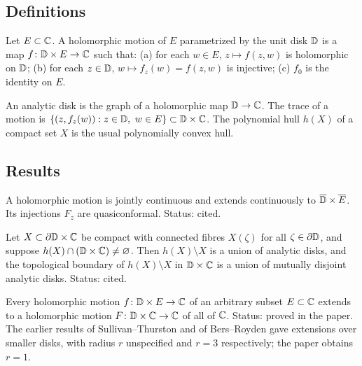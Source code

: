 \subsection*{Definitions}

\begin{definition}
\label{def:holomorphic-motion}
Let $E\subset\mathbb C$.  A holomorphic motion of $E$ parametrized by the unit disk $\mathbb D$ is a map $f\colon\mathbb D\times E\to\mathbb C$ such that:
(a) for each $w\in E$, $z\mapsto f(z,w)$ is holomorphic on $\mathbb D$; (b) for each $z\in\mathbb D$, $w\mapsto f_z(w)=f(z,w)$ is injective; (c) $f_0$ is the identity on $E$.
\end{definition}

\begin{definition}
\label{def:holomorphic-trace}
An analytic disk is the graph of a holomorphic map $\mathbb D\to\mathbb C$.  The trace of a motion is
$\{(z,f_z(w)):z\in\mathbb D,\ w\in E\}\subset\mathbb D\times\mathbb C$.  The polynomial hull $h(X)$ of a compact set $X$ is the usual polynomially convex hull.
\end{definition}

\subsection*{Results}

\begin{lemma}
\label{lem:lambda-lemma}
A holomorphic motion is jointly continuous and extends continuously to $\overline{\mathbb D}\times\overline E$.  Its injections
$F_z$ are quasiconformal.  Status: cited.
\end{lemma}

\begin{theorem}
\label{thm:slodkowski-1-2}
Let $X\subset\partial\mathbb D\times\mathbb C$ be compact with connected fibres $X(\zeta)$ for all $\zeta\in\partial\mathbb D$, and suppose
$h(X)\cap(\mathbb D\times\mathbb C)\neq\varnothing$.  Then $h(X)\setminus X$ is a union of analytic disks, and the topological boundary of
$h(X)\setminus X$ in $\mathbb D\times\mathbb C$ is a union of mutually disjoint analytic disks.  Status: cited.
\end{theorem}

\begin{theorem}
\label{thm:slodkowski-1-3}
Every holomorphic motion $f\colon\mathbb D\times E\to\mathbb C$ of an arbitrary subset $E\subset\mathbb C$ extends to a holomorphic motion
$F\colon\mathbb D\times\mathbb C\to\mathbb C$ of all of $\mathbb C$.  Status: proved in the paper.  The earlier results of Sullivan--Thurston and of
Bers--Royden gave extensions over smaller disks, with radius $r$ unspecified and $r=3$ respectively; the paper obtains
$r=1$.
\end{theorem}

